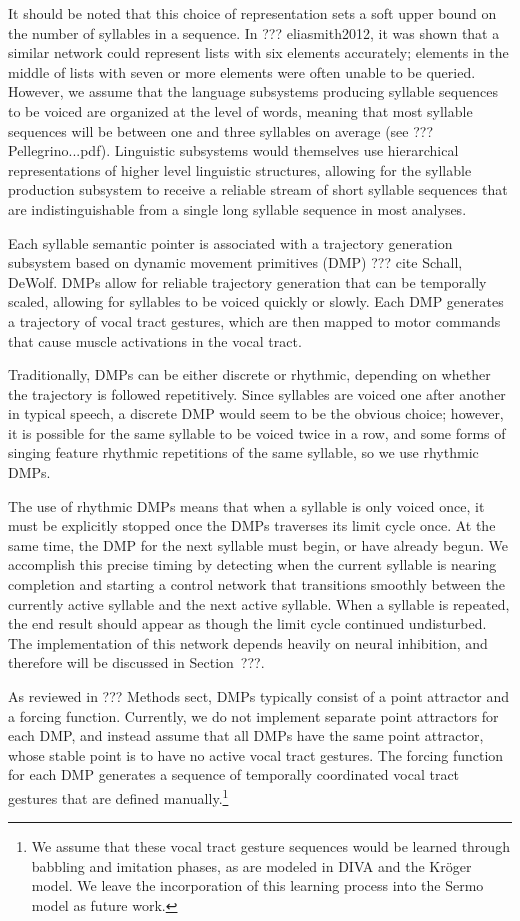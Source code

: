 It should be noted that
this choice of representation
sets a soft upper bound
on the number of syllables in a sequence.
In ??? eliasmith2012,
it was shown that a similar network
could represent lists with six elements accurately;
elements in the middle of
lists with seven or more elements
were often unable to be queried.
However, we assume that the
language subsystems producing
syllable sequences to be voiced
are organized at the level of words,
meaning that most syllable sequences
will be between one and three syllables
on average (see ??? Pellegrino...pdf).
Linguistic subsystems would themselves
use hierarchical representations
of higher level linguistic structures,
allowing for the syllable production subsystem
to receive a reliable stream of
short syllable sequences
that are indistinguishable from
a single long syllable sequence
in most analyses.

Each syllable semantic pointer
is associated with a
trajectory generation subsystem
based on dynamic movement primitives (DMP)
??? cite Schall, DeWolf.
DMPs allow for reliable trajectory generation
that can be temporally scaled,
allowing for syllables to be voiced
quickly or slowly.
Each DMP generates a trajectory
of vocal tract gestures,
which are then mapped to
motor commands that cause
muscle activations in the vocal tract.

Traditionally, DMPs can be either discrete or rhythmic,
depending on whether the trajectory
is followed repetitively.
Since syllables are voiced
one after another in typical speech,
a discrete DMP would seem to be
the obvious choice;
however, it is possible for
the same syllable to be voiced
twice in a row,
and some forms of singing
feature rhythmic repetitions
of the same syllable,
so we use rhythmic DMPs.

The use of rhythmic DMPs
means that when a syllable
is only voiced once,
it must be explicitly stopped
once the DMPs traverses
its limit cycle once.
At the same time,
the DMP for the next syllable must begin,
or have already begun.
We accomplish this precise timing
by detecting when the current syllable
is nearing completion
and starting a control network
that transitions smoothly
between the currently active syllable
and the next active syllable.
When a syllable is repeated,
the end result should appear as though
the limit cycle continued undisturbed.
The implementation of this network
depends heavily on neural inhibition,
and therefore will be discussed
in Section~???.

As reviewed in ??? Methods sect,
DMPs typically consist of a point attractor
and a forcing function.
Currently, we do not implement
separate point attractors for each DMP,
and instead assume that all DMPs
have the same point attractor,
whose stable point is
to have no active vocal tract gestures.
The forcing function for each DMP
generates a sequence of temporally coordinated
vocal tract gestures
that are defined manually.\footnote{
  We assume that these vocal tract gesture sequences
  would be learned through babbling and imitation phases,
  as are modeled in DIVA and the Kr\"{o}ger model.
  We leave the incorporation of this learning process
  into the Sermo model as future work.}

